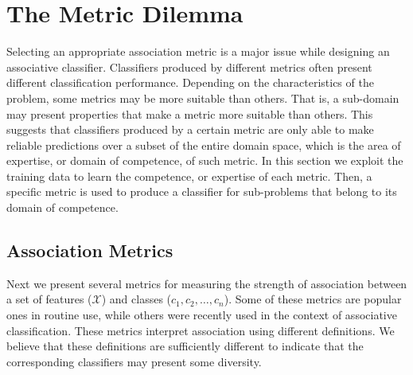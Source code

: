 \section{The Metric Dilemma}

Selecting an appropriate association metric is a major issue while designing an associative classifier. Classifiers produced by different metrics often present different classification performance. Depending on the characteristics of the problem, some metrics may be more suitable than others. 
That is, a sub-domain may present properties that make a metric more suitable than others.
This suggests that classifiers produced by a certain metric are only able to make reliable predictions over a subset of the entire domain space, which is the area of expertise, or domain of competence, of such metric.
In this section we exploit the training data to learn the competence, or expertise of each metric. Then, a specific metric is used to produce a classifier for sub-problems that belong to its domain of competence.

\subsection{Association Metrics}

Next we present several metrics for measuring the strength of association between a set of features ($\mathcal{X}$) and classes ($c_1, c_2,\ldots, c_n$).
Some of these metrics are popular ones in routine use\cite{rules,tan}, while others were recently used in the context of associative classification\cite{cccs}.
These metrics interpret association using different definitions. We believe that these definitions are sufficiently different to indicate that the corresponding classifiers may present some diversity.

